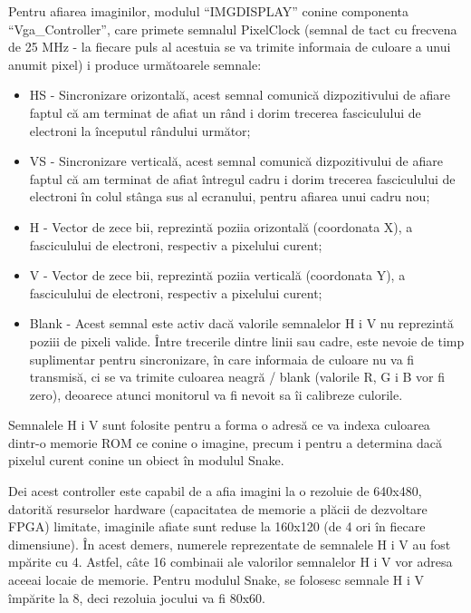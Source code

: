 \documentclass[a4paper,11pt,romanian]{article}
\begin{document}
{Pentru afiarea imaginilor, modulul ``IMGDISPLAY'' conine componenta ``Vga\_Controller'', care primete semnalul PixelClock (semnal de tact cu frecvena de 25 MHz - la fiecare puls al acestuia se va trimite informaia de culoare a unui anumit pixel) i produce urm\u{a}toarele semnale:
\begin{itemize}
 \item HS - Sincronizare orizontal\u{a}, acest semnal comunic\u{a} dizpozitivului de afiare faptul c\u{a} am terminat de afiat un r\^{a}nd i dorim trecerea fasciculului de electroni la \^{i}nceputul r\^{a}ndului urm\u{a}tor;
 \item VS - Sincronizare vertical\u{a}, acest semnal comunic\u{a} dizpozitivului de afiare faptul c\u{a} am terminat de afiat \^{i}ntregul cadru i dorim trecerea fasciculului de electroni \^{i}n colul st\^{a}nga sus al ecranului, pentru afiarea unui cadru nou;
 \item H - Vector de zece bii, reprezint\u{a} poziia orizontal\u{a} (coordonata X), a fasciculului de electroni, respectiv a pixelului curent;
 \item V - Vector de zece bii, reprezint\u{a} poziia vertical\u{a} (coordonata Y), a fasciculului de electroni, respectiv a pixelului curent;
 \item Blank - Acest semnal este activ dac\u{a} valorile semnalelor H i V nu reprezint\u{a} poziii de pixeli valide. \^{I}ntre trecerile dintre linii sau cadre, este nevoie de timp suplimentar pentru sincronizare, \^{i}n care informaia de culoare nu va fi transmis\u{a}, ci se va trimite culoarea neagr\u{a} / blank (valorile R, G i B vor fi zero), deoarece atunci monitorul va fi nevoit sa \^{i}i calibreze culorile.
\end{itemize}

Semnalele H i V sunt folosite pentru a forma o adres\u{a} ce va indexa culoarea dintr-o memorie ROM ce conine o imagine, precum i pentru a determina dac\u{a} pixelul curent conine un obiect \^{i}n modulul Snake.

Dei acest controller este capabil de a afia imagini la o rezoluie de 640x480, datorit\u{a} resurselor hardware (capacitatea de memorie a pl\u{a}cii de dezvoltare FPGA) limitate, imaginile afiate sunt reduse la 160x120 (de 4 ori \^{i}n fiecare dimensiune). \^{I}n acest demers, numerele reprezentate de semnalele H i V au fost mp\u{a}rite cu 4. Astfel, c\^{a}te 16 combinaii ale valorilor semnalelor H i V vor adresa aceeai locaie de memorie. Pentru modulul Snake, se folosesc semnale H i V \^{i}mp\u{a}rite la 8, deci rezoluia jocului va fi 80x60.

}
\end{document}
